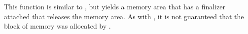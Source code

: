 \begin{haddockdesc}
\item[\begin{tabular}{@{}l}
mallocForeignPtrArray0 :: Storable a => Int -> IO (ForeignPtr a)
\end{tabular}]
{\haddockbegindoc
This function is similar to ,
 but yields a memory area that has a finalizer attached that releases
 the memory area.  As with , it is not guaranteed that
 the block of memory was allocated by .\par}
\end{haddockdesc}
